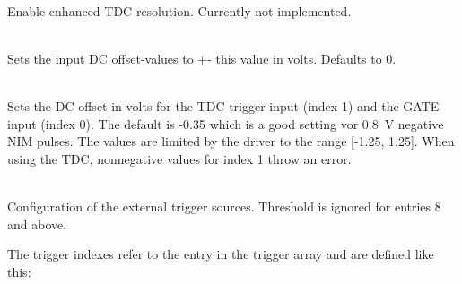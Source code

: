 			\\
			Enable enhanced TDC resolution. Currently not implemented.\par

			\\
			Sets the input DC offset-values to +- this value in volts. Defaults to 0.\par

			\\
			Sets the DC offset in volts for the TDC trigger input (index 1) and the GATE input (index 0). The default is -0.35 which is a good setting vor \SI{0.8}{\volt} negative NIM pulses.
			The values are limited by the driver to the range [-1.25, 1.25]. When using the TDC, nonnegative values for index 1 throw an error. \par

			\\
			Configuration of the external trigger sources. Threshold is ignored for entries 8 and above.\par
			
			The trigger indexes refer to the entry in the trigger array and are defined like this:\par

			\\
			\\
			\\
			\\
			\\
			\\
			\\
			\\
			\\
			\\
			\\
			\\
			\\
			\\
			\par
			
